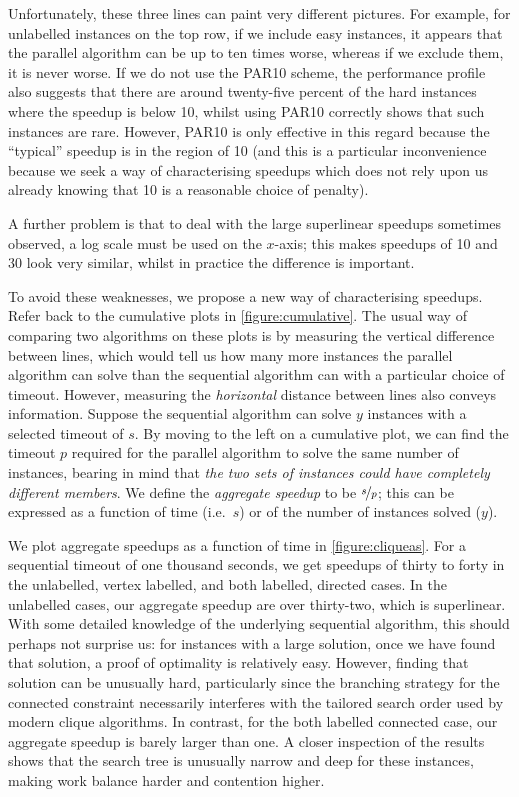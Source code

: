 \documentclass{llncs}
\begin{document}
Unfortunately, these three lines can paint very different pictures. For example, for unlabelled
instances on the top row, if we include easy instances, it appears that the parallel algorithm can
be up to ten times worse, whereas if we exclude them, it is never worse. If we do not use the PAR10
scheme, the performance profile also suggests that there are around twenty-five percent of the
hard instances where the speedup is below 10, whilst using PAR10 correctly shows that such instances
are rare. However, PAR10 is only effective in this regard because the ``typical'' speedup is in the
region of 10 (and this is a particular inconvenience because we seek a way of characterising
speedups which does not rely upon us already knowing that 10 is a reasonable choice of penalty).

A further problem is that to deal with the large superlinear speedups sometimes observed, a log
scale must be used on the $x$-axis; this makes speedups of 10 and 30 look very similar, whilst in
practice the difference is important.

To avoid these weaknesses, we propose a new way of characterising speedups. Refer back to the
cumulative plots in \cref{figure:cumulative}. The usual way of comparing two algorithms on these
plots is by measuring the vertical difference between lines, which would tell us how many more
instances the parallel algorithm can solve than the sequential algorithm can with a particular
choice of timeout.  However, measuring the \emph{horizontal} distance between lines also conveys
information. Suppose the sequential algorithm can solve $y$ instances with a selected timeout of
$s$. By moving to the left on a cumulative plot, we can find the timeout $p$ required for the
parallel algorithm to solve the same number of instances, bearing in mind that \emph{the two sets of
instances could have completely different members}. We define the \emph{aggregate speedup} to be
$\nicefrac{s}{p}$; this can be expressed as a function of time (i.e.\ $s$) or of the number of
instances solved ($y$).

We plot aggregate speedups as a function of time in \cref{figure:cliqueas}. For a sequential timeout
of one thousand seconds, we get speedups of thirty to forty in the unlabelled, vertex labelled, and
both labelled, directed cases. In the unlabelled cases, our aggregate speedup are over thirty-two,
which is superlinear.  With some detailed knowledge of the underlying sequential algorithm, this
should perhaps not surprise us: for instances with a large solution, once we have found that
solution, a proof of optimality is relatively easy. However, finding that solution can be unusually
hard, particularly since the branching strategy for the connected constraint necessarily interferes
with the tailored search order used by modern clique algorithms.  In contrast, for the both labelled
connected case, our aggregate speedup is barely larger than one. A closer inspection of the results
shows that the search tree is unusually narrow and deep for these instances, making work balance
harder and contention higher.
\end{document}
